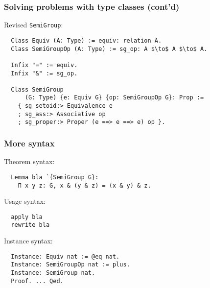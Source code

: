 \documentclass{beamer}
\begin{document}
\begin{frame}[fragile]
\frametitle{Solving problems with type classes (cont'd)}
Revised \lstinline|SemiGroup|:
\begin{lstlisting}
  Class Equiv (A: Type) := equiv: relation A.
  Class SemiGroupOp (A: Type) := sg_op: A $\to$ A $\to$ A.

  Infix "=" := equiv.
  Infix "&" := sg_op.

  Class SemiGroup
      (G: Type) {e: Equiv G} {op: SemiGroupOp G}: Prop :=
    { sg_setoid:> Equivalence e
    ; sg_ass:> Associative op
    ; sg_proper:> Proper (e ==> e ==> e) op }.
\end{lstlisting}

\end{frame}

\begin{frame}[fragile]
\frametitle{More syntax}
Theorem syntax:

\begin{lstlisting}
  Lemma bla `{SemiGroup G}:
    Π x y z: G, x & (y & z) = (x & y) & z.
\end{lstlisting}

Usage syntax:
\begin{lstlisting}
  apply bla
  rewrite bla
\end{lstlisting}

Instance syntax:
\begin{lstlisting}
  Instance: Equiv nat := @eq nat.
  Instance: SemiGroupOp nat := plus.
  Instance: SemiGroup nat.
  Proof. ... Qed.
\end{lstlisting}

\end{frame}


\end{document}
